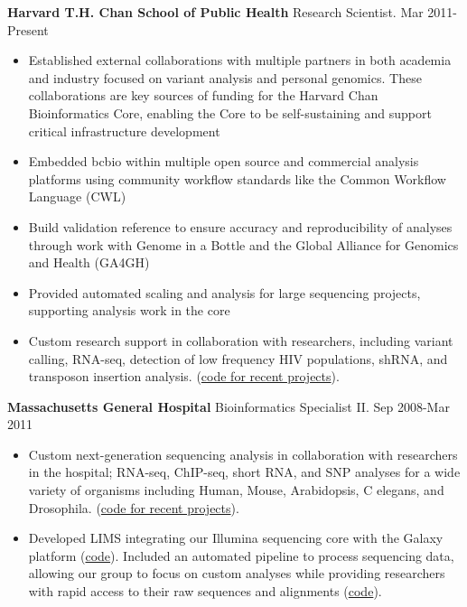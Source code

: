 \documentclass[10pt]{article}
\renewcommand{\section}[2]%
        {\pagebreak[2]\vspace{1.3\baselineskip}%
         \phantomsection\addcontentsline{toc}{section}{#1}%
         \hspace{0in}%
         \marginpar{
         \raggedright \scshape #1}#2}
\begin{document}
\section{Experience}
%
\textbf{Harvard T.H. Chan School of Public Health} Research Scientist. Mar 2011-Present
\begin{itemize}
  \item Established external collaborations with multiple partners in both
    academia and industry focused on variant analysis and personal genomics.
    These collaborations are key sources of funding for the Harvard Chan
    Bioinformatics Core, enabling the Core to be self-sustaining and support
    critical infrastructure development
  \item Embedded bcbio within multiple open source and commercial
    analysis platforms using community workflow standards like the Common
    Workflow Language (CWL)
  \item Build validation reference to ensure accuracy and
    reproducibility of analyses through work with Genome in a Bottle and the
    Global Alliance for Genomics and Health (GA4GH)
  \item Provided automated scaling and analysis for large sequencing
    projects, supporting analysis work in the core
  \item Custom research support in collaboration with researchers,
    including variant calling, RNA-seq, detection of low frequency HIV
    populations, shRNA, and transposon insertion analysis.
    (\href{https://github.com/hbc/projects}{code for recent projects}).
\end{itemize}

\textbf{Massachusetts General Hospital} Bioinformatics Specialist II. Sep 2008-Mar 2011
\begin{itemize}
  \item Custom next-generation sequencing analysis in collaboration with
    researchers in the hospital; RNA-seq, ChIP-seq, short RNA, and SNP 
    analyses for a wide variety of organisms including Human, Mouse, Arabidopsis,
    C elegans, and Drosophila.
    (\href{https://github.com/chapmanb/mgh_projects}{code for recent projects}).
  \item Developed LIMS integrating our Illumina sequencing core with 
    the Galaxy platform (\href{https://bitbucket.org/chapmanb/galaxy-central}{code}).
    Included an automated pipeline to process sequencing data, allowing our 
    group to focus on custom analyses while providing researchers with rapid
    access to their raw sequences and alignments
    (\href{https://github.com/chapmanb/bcbb/tree/master/nextgen}{code}).
\end{itemize}
\end{document}
